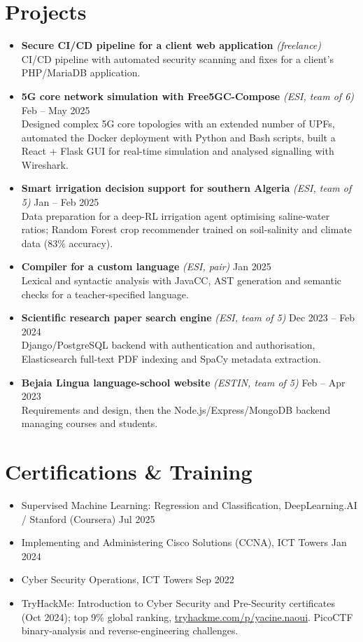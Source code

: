 \documentclass[10pt,a4paper]{article}
\newcommand{\proj}[3]{\textbf{#1} \textit{\small(#2)} \hfill {\small #3}}
\begin{document}
\section*{Projects}
\begin{itemize}
  \item \proj{Secure CI/CD pipeline for a client web application}{freelance}{} \\ CI/CD pipeline with automated security scanning and fixes for a client's PHP/MariaDB application.
  \item \proj{5G core network simulation with Free5GC-Compose}{ESI, team of 6}{Feb -- May 2025} \\ Designed complex 5G core topologies with an extended number of UPFs, automated the Docker deployment with Python and Bash scripts, built a React + Flask GUI for real-time simulation and analysed signalling with Wireshark.
  \item \proj{Smart irrigation decision support for southern Algeria}{ESI, team of 5}{Jan -- Feb 2025} \\ Data preparation for a deep-RL irrigation agent optimising saline-water ratios; Random Forest crop recommender trained on soil-salinity and climate data (83\% accuracy).
  \item \proj{Compiler for a custom language}{ESI, pair}{Jan 2025} \\ Lexical and syntactic analysis with JavaCC, AST generation and semantic checks for a teacher-specified language.
  \item \proj{Scientific research paper search engine}{ESI, team of 5}{Dec 2023 -- Feb 2024} \\ Django/PostgreSQL backend with authentication and authorisation, Elasticsearch full-text PDF indexing and SpaCy metadata extraction.
  \item \proj{Bejaia Lingua language-school website}{ESTIN, team of 5}{Feb -- Apr 2023} \\ Requirements and design, then the Node.js/Express/MongoDB backend managing courses and students.
\end{itemize}

\section*{Certifications \& Training}
\begin{itemize}
  \item Supervised Machine Learning: Regression and Classification, DeepLearning.AI / Stanford (Coursera) \hfill Jul 2025
  \item Implementing and Administering Cisco Solutions (CCNA), ICT Towers \hfill Jan 2024
  \item Cyber Security Operations, ICT Towers \hfill Sep 2022
  \item TryHackMe: Introduction to Cyber Security and Pre-Security certificates (Oct 2024); top 9\% global ranking, \href{https://tryhackme.com/p/yacine.naoui}{tryhackme.com/p/yacine.naoui}. PicoCTF binary-analysis and reverse-engineering challenges.
\end{itemize}
\end{document}
